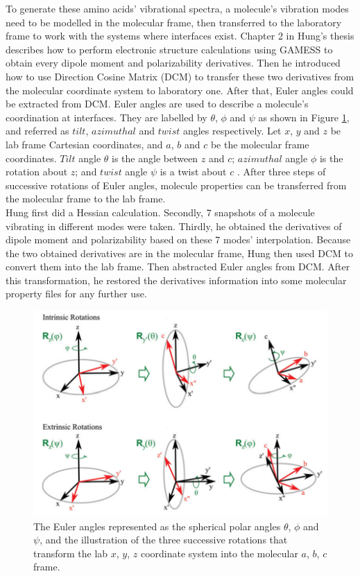 To generate these amino acids' vibrational spectra, a molecule's vibration modes need to be modelled in the molecular frame, then transferred to the laboratory frame to work with the systems where interfaces exist. Chapter 2 in Hung's thesis \cite{KuoKaiHung:Thesis:2015} describes how to perform electronic structure calculations using GAMESS \cite{GAMESS} to obtain every dipole moment and polarizability derivatives. Then he introduced how to use Direction Cosine Matrix (DCM) to transfer these two derivatives from the molecular coordinate system to laboratory one. After that, Euler angles could be extracted from DCM. Euler angles are used to describe a molecule's coordination at interfaces. They are labelled by $\theta$, $\phi$ and $\psi$ as shown in Figure \ref{fig:2.1}, and referred as $tilt$, $azimuthal$ and $twist$ angles respectively. Let $x$, $y$ and $z$ be lab frame Cartesian coordinates, and $a$, $b$ and $c$ be the molecular frame coordinates. $Tilt$ angle $\theta$ is the angle between $z$ and $c$; $azimuthal$ angle $\phi$ is the rotation about $z$; and $twist$ angle $\psi$ is a twist about $c$ \cite{hore0033-rotations}. After three steps of successive rotations of Euler angles, molecule properties can be transferred from the molecular frame to the lab frame. \\


Hung first did a Hessian calculation. Secondly, 7 snapshots of a molecule vibrating in different modes were taken. Thirdly, he obtained the derivatives of dipole moment and polarizability based on these 7 modes' interpolation. Because the two obtained derivatives are in the molecular frame, Hung then used DCM to convert them into the lab frame.  Then abstracted Euler angles from DCM. After this transformation, he restored the derivatives information into some molecular property files for any further use. \\

\begin{figure}[!ht] \label{fig:2.1}
\centering
\includegraphics[scale=0.5]{Figures/Euler_angles_represented_as_the_spherical_polar_angles.png} 
\caption{The Euler angles represented as the spherical polar angles $\theta$, $\phi$ and $\psi$, and the illustration of the three successive rotations that transform the lab $x$, $y$, $z$ coordinate system into the molecular $a$, $b$, $c$ frame. \cite{RotationProjection}} 
\end{figure}

